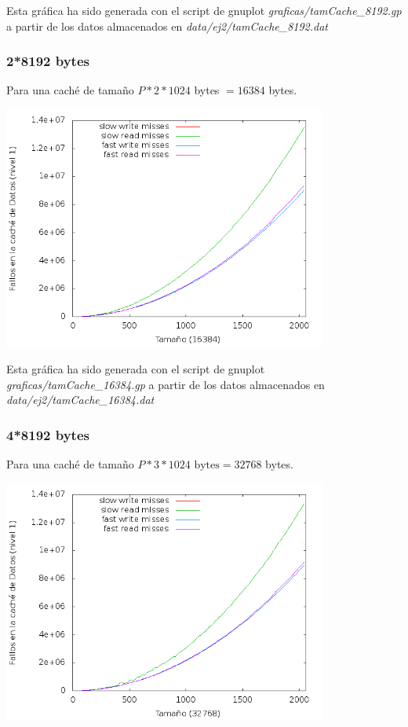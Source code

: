 \documentclass[nochap]{apuntes}
\begin{document}
Esta gráfica ha sido generada con el script de gnuplot \emph{graficas/tamCache\_8192.gp} a partir de los datos almacenados en \emph{data/ej2/tamCache\_8192.dat}
\subsubsection*{2*8192 bytes}
Para una caché de tamaño $P*2*1024$ bytes $= 16384 $ bytes.

\begin{center}
\includegraphics[width=0.8\textwidth]{graficas/fotos/Cache_16384.png}
\end{center}

Esta gráfica ha sido generada con el script de gnuplot \emph{graficas/tamCache\_16384.gp} a partir de los datos almacenados en \emph{data/ej2/tamCache\_16384.dat}

\subsubsection*{4*8192 bytes}

Para una caché de tamaño $P*3*1024\text{ bytes} = 32768 $ bytes.
\begin{center}
\includegraphics[width=0.8\textwidth]{graficas/fotos/Cache_32768.png}
\end{center}
\end{document}
